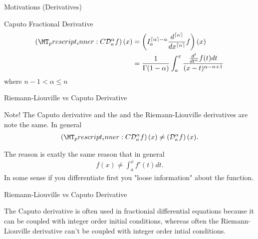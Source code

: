 \documentclass[pdf]{beamer}
\newcommand{\rld}[3]{ \left( \mathcal{D}_{#1}^{#2} #3 \right) }
\newcommand{\rli}[3]{ \left( I_{#1}^{#2} #3 \right) }
\newcommand{\capder}[3]{ \left( \prescript{C}{}{\mathcal{D}_{#1}^{#2}} #3 \right) }
\begin{document}
\begin{frame}{Motivations (Derivatives)}
	\begin{block}{Caputo Fractional Derivative}
		\begin{align*}
			\capder{a}{\alpha}{f}(x) &= \rli{a}{\lceil \alpha \rceil - \alpha}{\frac{d^{\lceil \alpha \rceil}}{dx^{\lceil \alpha \rceil}}f}(x) \\
				&= \frac{1}{\Gamma(1 - \alpha)} \int_a^x \frac{\frac{d^{t}}{dt^n}f(t)dt}{(x-t)^{\alpha - n + 1}}
		\end{align*}
		where $ n - 1 < \alpha \leq n $
	\end{block}
\end{frame}

\begin{frame}{ Riemann-Liouville vs Caputo Derivative}
	\begin{alertblock}{Note!}
		The Caputo derivative and the and the Riemann-Liouville derivatives are note the same.
		In general 
		\begin{align*}
			\capder{a}{\alpha}{f}(x) \neq \rld{a}{\alpha}{f}(x).
		\end{align*}
	\end{alertblock}
	The reason is exatly the same reason that in general
	\begin{align*}
		f(x) \neq \int_a^x f'(t) dt.
	\end{align*}
	In some sense if you differentiate first you "loose information" about the function.
\end{frame}

\begin{frame}{ Riemann-Liouville vs Caputo Derivative}

	The Caputo derivative is often used in fractionial differential equations because it
	can be coupled with integer order initial conditions, whereas often the Riemann-Liouville
	derivative can't be coupled with integer order intial conditions.

\end{frame}
	
\end{document}
